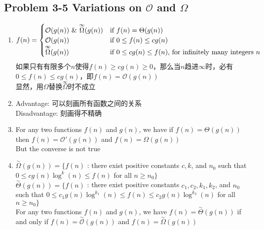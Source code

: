\subsection*{Problem 3-5 Variations on $\mathcal{O}$ and $\Omega$}
\begin{enumerate}
	\item	\begin{equation} \notag
			f(n)=\begin{cases}
				\mathcal{O}(g(n)) \text{ \& } \overset{\infty}{\Omega}(g(n)) & \text{if } f(n)=\Theta(g(n)) \\
				\mathcal{O}(g(n)) & \text{if } 0 \leq f(n) \leq cg(n) \\
				\overset{\infty}{\Omega}(g(n)) & \text{if } 0 \leq cg(n) \leq f(n) \text{, for infinitely many integers } n \\
			\end{cases}
		\end{equation}
		如果只有有限多个$n$使得$f(n) \geq cg(n) \geq 0$，那么当$n$趋进$\infty$时，必有$0 \leq f(n) \leq cg(n)$，即$f(n)=\mathcal{O}(g(n))$ \\
		显然，用$\Omega$替换$\overset{\infty}{\Omega}$时不成立
		
	\item	Advantage: 可以刻画所有函数之间的关系 \\
		Disadvantage: 刻画得不精确
	
	\item	For any two functions $f(n)$ and $g(n)$, we have if $f(n) = \Theta(g(n))$ then $f(n) = \mathcal{O}'(g(n))$ and $f(n) = \Omega(g(n))$ \\
		But the converse is not true
	
	\item	$\overset{\sim}{\Omega}(g(n))=\{ f(n)$ : there exist positive constants $c, k$, and $n_0$ such that $0 \leq cg(n)\log^k(n) \leq f(n)$ for all $n \geq n_0 \}$ \\
		$\overset{\sim}{\Theta}(g(n))=\{ f(n)$ : there exist positive constants $c_1, c_2, k_1, k_2$, and $n_0$ such that $0 \leq c_1g(n)\log^{k_1}(n) \leq f(n) \leq c_2g(n)\log^{k_2}(n)$ for all $n \geq n_0 \}$ \\
		For any two functions $f(n)$ and $g(n)$, we have $f(n) = \overset{\sim}{\Theta}(g(n))$ if and only if $f(n)=\overset{\sim}{\mathcal{O}}(g(n))$ and $f(n)=\overset{\sim}{\Omega}(g(n))$
\end{enumerate}

